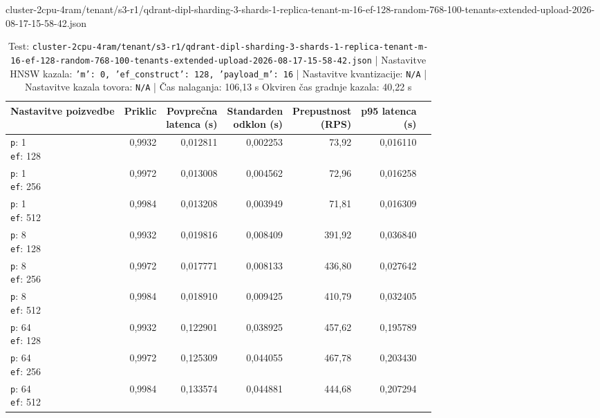 \begin{table}[htbp]
  \centering
\small
  \caption{cluster-2cpu-4ram/tenant/s3-r1/qdrant-dipl-sharding-3-shards-1-replica-tenant-m-16-ef-128-random-768-100-tenants-extended-upload-2026-08-17-15-58-42.json}
  \label{tab:cluster-2cpu-4ram:tenant:s3-r1:qdrant-dipl-sharding-3-shards-1-replica-tenant-m-16-ef-128-random-768-100-tenants-extended-upload-2026-08-17-15-58-42.json}
  \begin{tabularx}{\textwidth}{Xrrrrrr}
    \toprule
    Nastavitve poizvedbe & Priklic & \makecell{Povprečna\\latenca (s)} & \makecell{Standarden\\odklon (s)} & \makecell{Prepustnost\\(RPS)} & \makecell{p95 latenca\\(s)}  \\
    \midrule
    \makecell{\texttt{p}: 1\\\texttt{ef}: 128} & 0,9932 & 0,012811 & 0,002253 & 73,92 & 0,016110 \\
    \makecell{\texttt{p}: 1\\\texttt{ef}: 256} & 0,9972 & 0,013008 & 0,004562 & 72,96 & 0,016258 \\
    \makecell{\texttt{p}: 1\\\texttt{ef}: 512} & 0,9984 & 0,013208 & 0,003949 & 71,81 & 0,016309 \\
    \makecell{\texttt{p}: 8\\\texttt{ef}: 128} & 0,9932 & 0,019816 & 0,008409 & 391,92 & 0,036840 \\
    \makecell{\texttt{p}: 8\\\texttt{ef}: 256} & 0,9972 & 0,017771 & 0,008133 & 436,80 & 0,027642 \\
    \makecell{\texttt{p}: 8\\\texttt{ef}: 512} & 0,9984 & 0,018910 & 0,009425 & 410,79 & 0,032405 \\
    \makecell{\texttt{p}: 64\\\texttt{ef}: 128} & 0,9932 & 0,122901 & 0,038925 & 457,62 & 0,195789 \\
    \makecell{\texttt{p}: 64\\\texttt{ef}: 256} & 0,9972 & 0,125309 & 0,044055 & 467,78 & 0,203430 \\
    \makecell{\texttt{p}: 64\\\texttt{ef}: 512} & 0,9984 & 0,133574 & 0,044881 & 444,68 & 0,207294 \\
    \bottomrule
  \end{tabularx}
\caption* {Test: \texttt{cluster-2cpu-4ram/tenant/s3-r1/qdrant-dipl-sharding-3-shards-1-replica-tenant-m-16-ef-128-random-768-100-tenants-extended-upload-2026-08-17-15-58-42.json} | Nastavitve HNSW kazala: \texttt{{'m': 0, 'ef\_construct': 128, 'payload\_m': 16}} | Nastavitve kvantizacije: \texttt{N/A} | Nastavitve kazala tovora: \texttt{N/A} | Čas nalaganja: 106,13 s Okviren čas gradnje kazala: 40,22 s}\end{table}


